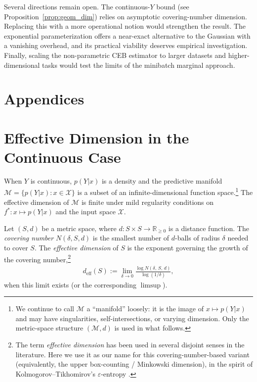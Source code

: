 \documentclass[11pt]{article}
\begin{document}
Several directions remain open.
The continuous-$Y$ bound (see Proposition~\ref{prop:geom_dim}) relies on
asymptotic covering-number dimension. Replacing this with a more
operational notion would strengthen the result.
The exponential parameterization offers a near-exact alternative to
the Gaussian with a vanishing overhead, and its practical viability
deserves empirical investigation.
Finally, scaling the non-parametric CEB estimator to larger datasets
and higher-dimensional tasks would test the limits of the minibatch
marginal approach.






\appendix

\section*{Appendices}

\section{Effective Dimension in the Continuous Case}
\label{app:eff_dim}

When $Y$ is continuous, $p(Y|x)$ is a density and the predictive
manifold $\mathcal{M}=\{p(Y|x):x\in\mathcal{X}\}$ is a subset of an
infinite-dimensional function space.\footnote{We continue to call
$\mathcal{M}$ a ``manifold'' loosely: it is the image of
$x\mapsto p(Y|x)$ and may have singularities, self-intersections, or
varying dimension. Only the metric-space structure $(\mathcal{M},d)$
is used in what follows.}
The effective dimension of $\mathcal{M}$ is finite under mild regularity
conditions on $f^*\colon x\mapsto p(Y|x)$ and the input space
$\mathcal{X}$.

Let $(S,d)$ be a metric space, where $d:S\times S\to\mathbb{R}_{\geq 0}$
is a distance function.
The \textit{covering number} $N(\delta,S,d)$ is the smallest number of
$d$-balls of radius $\delta$ needed to cover $S$.
The \textit{effective dimension} of $S$ \cite{kolmogorov1961epsilon}
is the exponent governing the growth of the covering
number,\footnote{The term \textit{effective dimension} has been used
in several disjoint senses in the literature. Here we use it as our
name for this covering-number-based variant (equivalently, the upper
box-counting / Minkowski dimension), in the spirit of
Kolmogorov--Tikhomirov's $\varepsilon$-entropy
\cite{kolmogorov1961epsilon}.}
\begin{align}
    d_{\mathrm{eff}}(S) := \lim_{\delta\to 0}
    \frac{\log N(\delta,\,S,\,d)}{\log(1/\delta)},
    \label{eq:eff_dim_def}
\end{align}
when this limit exists (or the corresponding $\limsup$).
\end{document}
